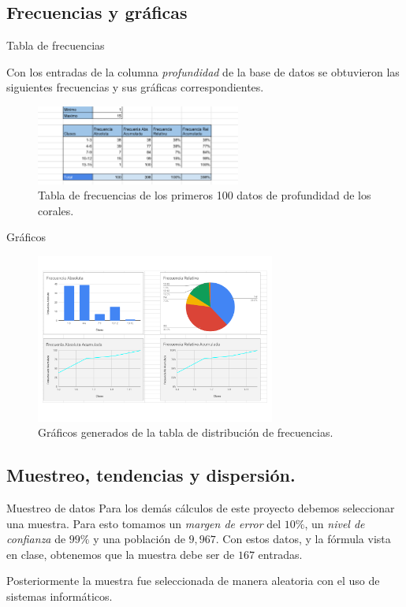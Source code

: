\documentclass[11pt]{beamer}
\begin{document}
	\subsection{Frecuencias y gráficas}
	\begin{frame}{Tabla de frecuencias}
		\par Con los entradas de la columna \textit{profundidad} de la base de datos se obtuvieron las siguientes frecuencias y sus gráficas correspondientes.
	
		\begin{figure}[h]
			\centering
				\includegraphics[width=0.6\textwidth]{dataset_coral-frecuencias.png}
			\caption{Tabla de frecuencias de los primeros 100 datos de profundidad de los corales.}
			\label{fig: tabla frecuencia}
		\end{figure}
	\end{frame}
	
	\begin{frame}{Gráficos}
		\begin{figure}[h]
			\centering
				\includegraphics[width=0.7\textwidth]{dataset_coral-graficos.png}
			\caption{Gr\'aficos generados de la tabla de distribuci\'on de frecuencias.}
			\label{fig: graficos}
		\end{figure}
	\end{frame}
	
	
	\subsection{Muestreo, tendencias y dispersión.}
	\begin{frame}{Muestreo de datos}
		Para los demás cálculos de este proyecto debemos seleccionar una muestra. Para esto tomamos un \textit{margen de error} del $10\%$, un \textit{nivel de confianza} de $99\%$ y una población de $9,967$. Con estos datos, y la fórmula vista en clase, obtenemos que la muestra debe ser de $167$ entradas.
		\par Posteriormente la muestra fue seleccionada de manera aleatoria con el uso de sistemas informáticos.
	\end{frame}
	
\end{document}
